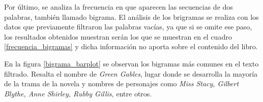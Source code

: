 \documentclass[12pt]{article}
\begin{document}
	
	Por último, se analiza la frecuencia en que aparecen las secuencias de dos palabras, también llamado bigrama. El análisis de los brigramas se realiza con los datos que previamente filtraron las palabras vacías, ya que si se omite ese paso, los resultados obtenidos muestran serán los que se muestran en el cuadro \ref{frecuencia_bigramas} y dicha información no aporta sobre el contenido del libro.
	

	En la figura \ref{bigrama_barplot} se observan los bigramas más comunes en el texto filtrado. Resalta el nombre de \textit{Green Gables}, lugar donde se desarrolla la mayoría de la trama de la novela y nombres de personajes como \textit{Miss Stacy,  Gilbert Blythe, Anne Shirley, Rubby Gillis,} entre otros.
	

	


\end{document}

